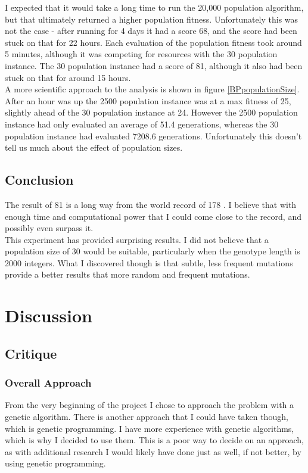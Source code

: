 \documentclass[]{report}
\begin{document}
I expected that it would take a long time to run the 20,000 population algorithm, but that ultimately returned a higher population fitness. Unfortunately this was not the case - after running for 4 days it had a score 68, and the score had been stuck on that for 22 hours. Each evaluation of the population fitness took around 5 minutes, although it was competing for resources with the 30 population instance. The 30 population instance had a score of 81, although it also had been stuck on that for around 15 hours.\\

A more scientific approach to the analysis is shown in figure \ref{BPpopulationSize}. After an hour was up the 2500 population instance was at a max fitness of 25, slightly ahead of the 30 population instance at 24. However the 2500 population instance had only evaluated an average of 51.4 generations, whereas the 30 population instance had evaluated 7208.6 generations. Unfortunately this doesn't tell us much about the effect of population sizes.

\section{Conclusion}
The result of 81 is a long way from the world record of 178 \cite{morpionRecord}. I believe that with enough time and computational power that I could come close to the record, and possibly even surpass it.\\

This experiment has provided surprising results. I did not believe that a population size of 30 would be suitable, particularly when the genotype length is 2000 integers. What I discovered though is that subtle, less frequent mutations provide a better results that more random and frequent mutations.

\chapter{Discussion}
\section{Critique}
\subsection{Overall Approach}
From the very beginning of the project I chose to approach the problem with a genetic algorithm. There is another approach that I could have taken though, which is genetic programming. I have more experience with genetic algorithms, which is why I decided to use them. This is a poor way to decide on an approach, as with additional research I would likely have done just as well, if not better, by using genetic programming.
\end{document}
